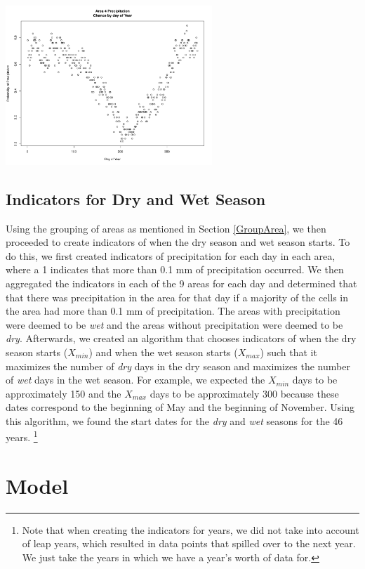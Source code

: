\documentclass{article}
\begin{document}
\includegraphics[width = .4\textwidth, height = 6cm]{Area4PrecipByDay}

\subsection{Indicators for Dry and Wet Season}
Using the grouping of areas as mentioned in Section \ref{GroupArea}, we then proceeded to create indicators of when the dry season and wet season starts. To do this, we first created indicators of precipitation for each day in each area, where a 1 indicates that more than 0.1 mm of precipitation occurred.  We then aggregated the indicators in each of the 9 areas for each day and determined that that there was precipitation in the area for that day if a majority of the cells in the area had more than 0.1 mm of precipitation. The areas with precipitation were deemed to be \textit{wet} and the areas without precipitation were deemed to be \textit{dry}. Afterwards, we created an algorithm that chooses indicators of when the dry season starts ($X_{min}$) and when the wet season starts ($X_{max}$) such that it maximizes the number of \textit{dry} days in the dry season and maximizes the number of \textit{wet} days in the wet season. For example, we expected the $X_{min}$ days to be approximately 150 and the $X_{max}$ days to be approximately 300 because these dates correspond to the beginning of May and the beginning of November. Using this algorithm, we found the start dates for the \textit{dry} and \textit{wet} seasons for the 46 years. \footnote{Note that when creating the indicators for years, we did not take into account of leap years, which resulted in data points that spilled over to the next year. We just take the years in which we have a year's worth of data for.}




\section{Model}
\end{document}
